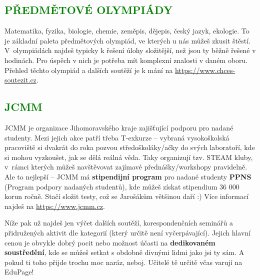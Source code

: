 \documentclass[a5paper, twoside]{article}
\newcommand{\podnadpis}[2]{
  \subsection*{\textcolor{#2}{#1}}
}
\begin{document}
\podnadpis{PŘEDMĚTOVÉ OLYMPIÁDY}{green}
Matematika, fyzika, biologie, chemie, zeměpis, dějepis, český jazyk, ekologie.
To je základní paleta předmětových olympiád, ve kterých u nás můžeš zkusit štěstí.
V~olympiádách najdeš typicky k řešení úlohy složitější, než jsou ty běžně řešené v hodinách.
Pro úspěch v nich je potřeba mít komplexní znalosti v daném oboru. Přehled těchto olympiád a
dalších soutěží je k mání na \url{https://www.chces-soutezit.cz}.

\podnadpis{JCMM}{green}
JCMM je organizace Jihomoravského kraje zajišťující podporu pro nadané studenty. Mezi jejich akce patří
třeba T-exkurze -- vybraná vysokoškolská pracoviště si dvakrát do roka pozvou středoškoláky/ačky do
svých laboratoří, kde si mohou vyzkoušet, jak se dělá reálná věda. Taky organizují tzv. STEAM kluby,
v~rámci kterých můžeš navštěvovat zajímavé přednášky/workshopy pravidelně. Ale to nejlepší -- JCMM má \textbf{stipendijní program}
pro nadané studenty \textbf{PPNS} (Program podpory nadaných studentů), kde můžeš získat stipendium
36 000 korun ročně. Stačí složit testy, což se Jarošákům většinou daří :) Více informací najdeš na
\url{https://www.jcmm.cz}.
\par \noindent Níže pak už najdeš jen výčet dalších soutěží, korespondenčních seminářů a přidružených aktivit dle kategorií (který určitě není vyčerpávající).
Jejich hlavní cenou je obvykle dobrý pocit nebo možnost účasti na \textbf{dedikovaném soustředění},
kde se můžeš setkat s obdobně divnými lidmi jako jsi ty sám. A pokud ti toho přijde trochu moc naráz, neboj.
Učitelé tě určitě včas varují na EduPage!
\end{document}
